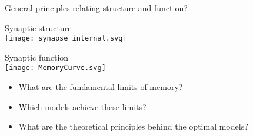 \documentclass{beamer}%
\newcommand{\inv}{^{-1}}
\newcommand{\syn}{\vec{w}}
\newcommand{\synid}{\vec{s}}
\DeclareMathOperator{\snr}{SNR}
\newcommand{\snrb}{\overline{\snr}}
\renewcommand{\e}{\mathsf{e}}
\begin{document}
%
%
%
%
%
%

\begin{frame}{General principles relating structure and function?}
%
 \vspace{-2\baselineskip}
 \begin{center}
 \parbox[t]{0.35\linewidth}{%
 \begin{center}
   Synaptic structure\\
   \texttt{[image: synapse\_internal.svg]}
 \end{center}
 }
 \hspace{0.1\linewidth}
 \parbox[t]{0.3\linewidth}{%
 \begin{center}
   Synaptic function\\
   \texttt{[image: MemoryCurve.svg]}
 \end{center}
 }
 \end{center}
 \begin{itemize}
   \item What are the fundamental limits of memory?
   \vp\item Which models achieve these limits?
   \vp\item What are the theoretical principles behind the optimal models?
 \end{itemize}
%
\end{frame}
\end{document}
